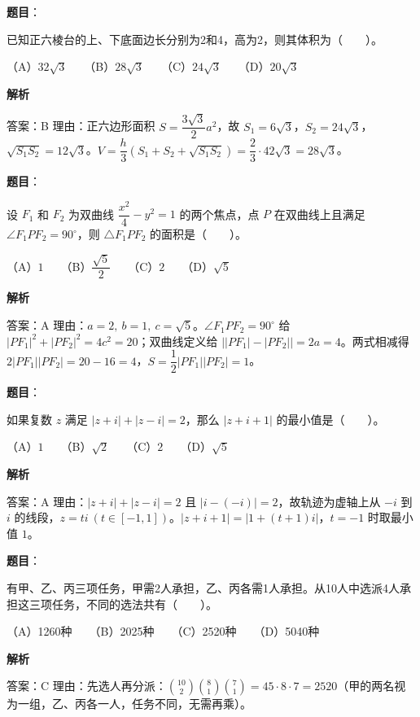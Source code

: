 \begin{answer}

\textbf{题目}：

已知正六棱台的上、下底面边长分别为2和4，高为2，则其体积为\mbox{（　　）}。

（A）$32\sqrt3$　　（B）$28\sqrt3$　　（C）$24\sqrt3$　　（D）$20\sqrt3$

\textbf{解析}

答案：B
理由：正六边形面积 $S=\dfrac{3\sqrt3}{2}a^2$，故 $S_1=6\sqrt3$，$S_2=24\sqrt3$，$\sqrt{S_1S_2}=12\sqrt3$。$V=\dfrac h3(S_1+S_2+\sqrt{S_1S_2})=\dfrac23\cdot42\sqrt3=28\sqrt3$。


\end{answer}
\begin{answer}

\textbf{题目}：

设 $F_1$ 和 $F_2$ 为双曲线 $\dfrac{x^2}{4}-y^2=1$ 的两个焦点，点 $P$ 在双曲线上且满足 $\angle F_1PF_2=90^\circ$，则 $\triangle F_1PF_2$ 的面积是\mbox{（　　）}。

（A）$1$　　（B）$\dfrac{\sqrt5}{2}$　　（C）$2$　　（D）$\sqrt5$

\textbf{解析}

答案：A
理由：$a=2,\ b=1,\ c=\sqrt5$。$\angle F_1PF_2=90^\circ$ 给 $|PF_1|^2+|PF_2|^2=4c^2=20$；双曲线定义给 $\big||PF_1|-|PF_2|\big|=2a=4$。两式相减得 $2|PF_1||PF_2|=20-16=4$，$S=\dfrac12|PF_1||PF_2|=1$。


\end{answer}
\begin{answer}

\textbf{题目}：

如果复数 $z$ 满足 $|z+i|+|z-i|=2$，那么 $|z+i+1|$ 的最小值是\mbox{（　　）}。

（A）$1$　　（B）$\sqrt2$　　（C）$2$　　（D）$\sqrt5$

\textbf{解析}

答案：A
理由：$|z+i|+|z-i|=2$ 且 $|i-(-i)|=2$，故轨迹为虚轴上从 $-i$ 到 $i$ 的线段，$z=ti\ (t\in[-1,1])$。$|z+i+1|=|1+(t+1)i|$，$t=-1$ 时取最小值 $1$。


\end{answer}
\begin{answer}

\textbf{题目}：

有甲、乙、丙三项任务，甲需2人承担，乙、丙各需1人承担。从10人中选派4人承担这三项任务，不同的选法共有\mbox{（　　）}。

（A）1260种　　（B）2025种　　（C）2520种　　（D）5040种

\textbf{解析}

答案：C
理由：先选人再分派：$\binom{10}{2}\binom81\binom71=45\cdot8\cdot7=2520$（甲的两名视为一组，乙、丙各一人，任务不同，无需再乘）。


\end{answer}
